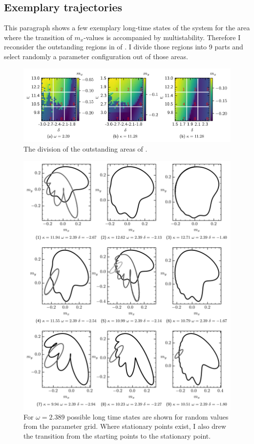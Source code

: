 \begin{appendices}
    \section{Exemplary trajectories}
    \label{appendix:expl_traj}
    This paragraph shows a few exemplary long-time states of the system for the area where the transition of $m_x$-values is accompanied by multistability. Therefore I reconsider the outstanding regions in  of . I divide those regions into 9 parts and select randomly a parameter configuration out of those areas.
    \begin{figure}[H]
        \centering
        \includegraphics{pictures/combined_spec_sec.png}
        \caption{The division of the outstanding areas of .}
    \end{figure}
    
    \begin{figure}[H]
        \centering
        \includegraphics{pictures/lc_traj_wcut3.png}
        \caption{For $\omega=2.389$ possible long time states are shown for random values from the parameter grid. Where stationary points exist, I also drew the transition from the starting points to the stationary point.}
    \end{figure}
    

\end{appendices}
